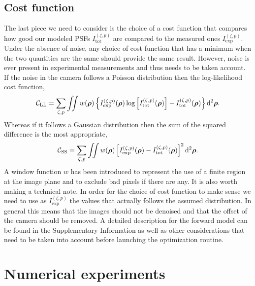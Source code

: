 \documentclass[reprint,aps,pra,superscriptaddress,
amsmath,amssymb]{revtex4-1}
\begin{document}
\subsection{Cost function}

The last piece we need to consider is the choice of a cost function that 
compares how good our modeled PSFs $I^{(\zeta ,p)}_\text{tot}$
are compared to the measured ones $I^{(\zeta ,p)}_\text{exp}$.
Under the absence of noise, any choice of cost function that has a minimum 
when the two quantities are the same should provide the same result. However,
noise is ever present in experimental measurements and thus needs to be taken
account. If the noise in the camera follows a Poisson distribution then the 
log-likelihood cost function,
\begin{align}
  \mathcal{C}_\text{LL} = \sum_{\zeta,p} \iint w(\boldsymbol \rho )\left\{ 
    I^{(\zeta ,p)}_\text{exp} (\boldsymbol \rho )
  \log \left[ I^{(\zeta ,p)}_\text{tot} (\boldsymbol \rho ) \right]
  - I^{(\zeta ,p)}_\text{tot} (\boldsymbol \rho )\right\} \mathrm{d}^2 \boldsymbol \rho.
\end{align}
Whereas if it follows a Gaussian distribution then the sum of the squared 
difference is the most appropriate,
\begin{align}
  \mathcal{C}_\text{SS} = \sum_{\zeta,p} \iint w(\boldsymbol \rho )\left[
    I^{(\zeta ,p)}_\text{exp} (\boldsymbol \rho )
  - I^{(\zeta ,p)}_\text{tot} (\boldsymbol \rho )\right]^2 \mathrm{d}^2 \boldsymbol \rho.
\end{align}
A window function $w$ has been introduced to represent the use of a finite
region at the image plane and to exclude bad pixels if there are any.
It is also worth making a technical note. In order for the choice of cost function 
to make sense we need to use as $I^{(\zeta ,p)}_\text{exp}$ the values that 
actually follows the assumed distribution. In general this means that the images
should not be denoised and that the offset of the camera should be removed.
A detailed description for the forward model can be found in the Supplementary 
Information as well as other considerations that need to be taken into account 
before launching the optimization routine. 


\section{Numerical experiments}
\end{document}
